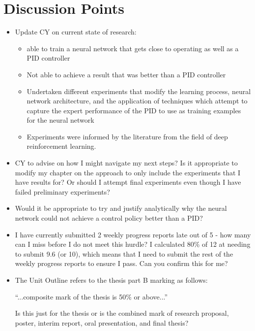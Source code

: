 \documentclass[12pt]{article}
\begin{document}
	\section{Discussion Points}
	\begin{itemize}
		\item Update CY on current state of research:
		\begin{itemize}
			\item able to train a neural network that gets close to operating as well as a PID controller
			\item Not able to achieve a result that was better than a PID controller
			\item Undertaken different experiments that modify the learning process, neural network architecture, and the application of techniques which attempt to capture the expert performance of the PID to use as training examples for the neural network
			\item Experiments were informed by the literature from the field of deep reinforcement learning.
		\end{itemize}
		\item CY to advise on how I might navigate my next steps? Is it appropriate to modify my chapter on the approach to only include the experiments that I have results for? Or should I attempt final experiments even though I have failed preliminary experiments?
		\item Would it be appropriate to try and justify analytically why the neural network could not achieve a control policy better than a PID?
		\item I have currently submitted 2 weekly progress reports late out of 5 - how many can I miss before I do not meet this hurdle? I calculated 80\% of 12 at needing to submit 9.6 (or 10), which means that I need to submit the rest of the weekly progress reports to ensure I pass. Can you confirm this for me?
		\item The Unit Outline refers to the thesis part B marking as follows:
		\begin{center}
			``...composite mark of the thesis is 50\% or above...''
		\end{center}
		Is this just for the thesis or is the combined mark of research proposal, poster, interim report, oral presentation, and final thesis?
	\end{itemize}
\end{document}
